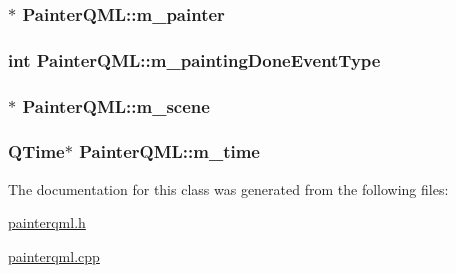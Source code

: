 \hypertarget{class_painter_q_m_l_a6b21bae1a75260e121bc56cda38729c8}{
\subsubsection[{m\+\_\+painter}]{$\ast$ Painter\+Q\+M\+L\+::m\+\_\+painter\hspace{0.3cm}{\ttfamily [protected]}}}\label{class_painter_q_m_l_a6b21bae1a75260e121bc56cda38729c8}
\hypertarget{class_painter_q_m_l_a7a6641710573e4fa47dfdae13e87d58e}{
\subsubsection[{m\+\_\+painting\+Done\+Event\+Type}]{\setlength{\rightskip}{0pt plus 5cm}int Painter\+Q\+M\+L\+::m\+\_\+painting\+Done\+Event\+Type\hspace{0.3cm}{\ttfamily [protected]}}}\label{class_painter_q_m_l_a7a6641710573e4fa47dfdae13e87d58e}
\hypertarget{class_painter_q_m_l_a5eccac2ab6d9974a9ae94573ac7b19d6}{
\subsubsection[{m\+\_\+scene}]{$\ast$ Painter\+Q\+M\+L\+::m\+\_\+scene\hspace{0.3cm}{\ttfamily [protected]}}}\label{class_painter_q_m_l_a5eccac2ab6d9974a9ae94573ac7b19d6}
\hypertarget{class_painter_q_m_l_ad4ced718f47b69f2344a5311ec87a156}{
\subsubsection[{m\+\_\+time}]{\setlength{\rightskip}{0pt plus 5cm}Q\+Time$\ast$ Painter\+Q\+M\+L\+::m\+\_\+time\hspace{0.3cm}{\ttfamily [protected]}}}\label{class_painter_q_m_l_ad4ced718f47b69f2344a5311ec87a156}


The documentation for this class was generated from the following files\+:\begin{DoxyCompactItemize}
\item 
\hyperlink{painterqml_8h}{painterqml.\+h}\item 
\hyperlink{painterqml_8cpp}{painterqml.\+cpp}\end{DoxyCompactItemize}
